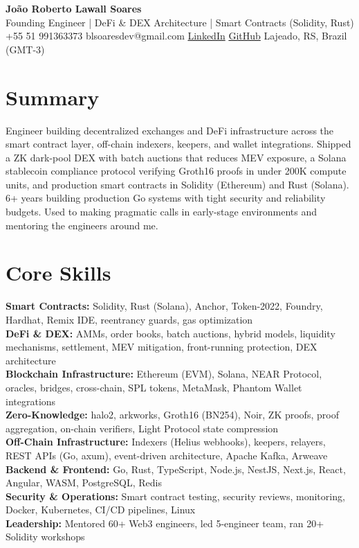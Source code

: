 \documentclass[10pt,a4paper]{article}
\begin{document}
\begin{center}
    {\LARGE\bfseries\color{headercolor} Jo\~{a}o Roberto Lawall Soares}\\[3pt]
    {\large\color{subtitlecolor} Founding Engineer | DeFi \& DEX Architecture | Smart Contracts (Solidity, Rust)}\\[4pt]
    {\footnotesize +55 51 991363373 \quad \textbullet \quad blsoaresdev@gmail.com \quad \textbullet \quad \href{https://www.linkedin.com/in/blsoaresdev/}{LinkedIn} \quad \textbullet \quad \href{https://github.com/Dnreikronos}{GitHub} \quad \textbullet \quad Lajeado, RS, Brazil (GMT-3)}
\end{center}

\section{Summary}
{\footnotesize Engineer building decentralized exchanges and DeFi infrastructure across the smart contract layer, off-chain indexers, keepers, and wallet integrations. Shipped a ZK dark-pool DEX with batch auctions that reduces MEV exposure, a Solana stablecoin compliance protocol verifying Groth16 proofs in under 200K compute units, and production smart contracts in Solidity (Ethereum) and Rust (Solana). 6+ years building production Go systems with tight security and reliability budgets. Used to making pragmatic calls in early-stage environments and mentoring the engineers around me.}

\section{Core Skills}
{\footnotesize
\textbf{Smart Contracts:} Solidity, Rust (Solana), Anchor, Token-2022, Foundry, Hardhat, Remix IDE, reentrancy guards, gas optimization\\
\textbf{DeFi \& DEX:} AMMs, order books, batch auctions, hybrid models, liquidity mechanisms, settlement, MEV mitigation, front-running protection, DEX architecture\\
\textbf{Blockchain Infrastructure:} Ethereum (EVM), Solana, NEAR Protocol, oracles, bridges, cross-chain, SPL tokens, MetaMask, Phantom Wallet integrations\\
\textbf{Zero-Knowledge:} halo2, arkworks, Groth16 (BN254), Noir, ZK proofs, proof aggregation, on-chain verifiers, Light Protocol state compression\\
\textbf{Off-Chain Infrastructure:} Indexers (Helius webhooks), keepers, relayers, REST APIs (Go, axum), event-driven architecture, Apache Kafka, Arweave\\
\textbf{Backend \& Frontend:} Go, Rust, TypeScript, Node.js, NestJS, Next.js, React, Angular, WASM, PostgreSQL, Redis\\
\textbf{Security \& Operations:} Smart contract testing, security reviews, monitoring, Docker, Kubernetes, CI/CD pipelines, Linux\\
\textbf{Leadership:} Mentored 60+ Web3 engineers, led 5-engineer team, ran 20+ Solidity workshops
}
\end{document}
